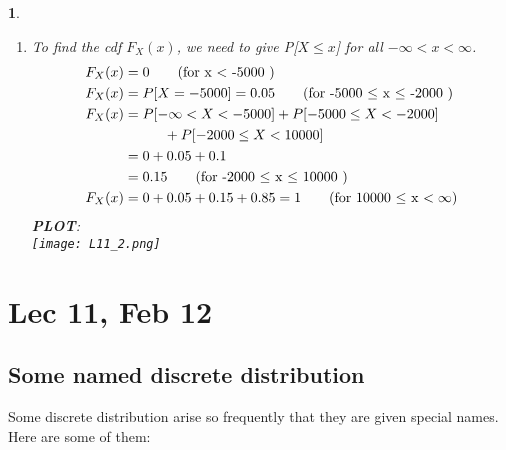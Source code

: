 \documentclass[11pt]{article}
\newtheorem*{solution}{\framebox{Sol}}
\newcommand\tab[1][1cm]{\hspace*{#1}}
\begin{document}
\begin{solution}
\begin{enumerate}
                            \textbf{PLOT:}\\ 
                            \texttt{[image: L11\_1.png]}
                    \item To find the cdf $F_X(x)$, we need to give P[$X \leq x$] for all $-\infty < x < \infty$. 
                            \begin{align*}
                                F_X(x) &= 0                \tag{for x $<$ -5000 }\\
                                F_X(x) &= P[X = -5000] = 0.05              \tag{for -5000 $\leq$ x $\leq$ -2000 } \\
                                F_X(x) &= P[-\infty < X < -5000] + P[-5000 \leq X < -2000] \\
                                       & \tab + P[-2000 \leq X < 10000] \\
                                       &= 0 + 0.05 + 0.1 \\
                                       &= 0.15 \tag{for -2000 $\leq$ x $\leq$ 10000 } \\
                                F_X(x) &= 0 + 0.05 + 0.15 + 0.85 = 1 \tag{for 10000 $\leq$ x $< \infty$}
                            \end{align*}
                            \textbf{PLOT}: \\\texttt{[image: L11\_2.png]}
                \end{enumerate}
            \end{solution}
   
    \newpage
    \section{Lec 11, Feb 12}
        \subsection{Some named discrete distribution}
            Some discrete distribution arise so frequently that they are given special names. Here are some of them:
\end{document}
